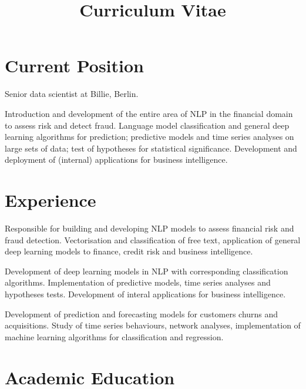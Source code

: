 \documentclass[11pt,a4paper,sans]{moderncv}
\title{Curriculum Vitae}
\begin{document}
 \makecvtitle


\section{Current Position} Senior data scientist at Billie, Berlin.

\bigskip Introduction and development of the entire area of NLP in the
financial domain to assess risk and detect fraud. Language model classification and general
deep learning algorithms for prediction; predictive models and time series
analyses on large sets of data; test of hypotheses for statistical significance.
Development and deployment of (internal) applications for business intelligence.

\section{Experience}
 {
Responsible for building and developing NLP
models to assess financial risk and fraud detection.  Vectorisation and
classification of free text, application of general deep learning models to
finance, credit risk and business intelligence.}

 {
Development of deep learning models in NLP with corresponding classification algorithms.
Implementation of predictive models, time series analyses and hypotheses tests. Development of
interal applications for business intelligence.}

 {Development
of prediction and forecasting models for customers churns and acquisitions.
Study of time series behaviours, network analyses, implementation of machine
learning algorithms for classification and regression.}



\section{Academic Education}
\end{document}
